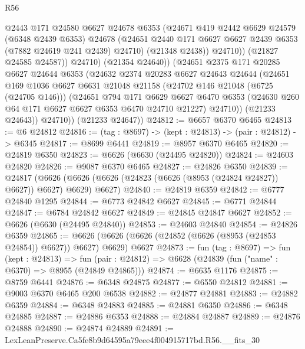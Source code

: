 \begin{lexlean}{R56}
\begin{coremodule}
                  @2443
                  @171
                  @24580
                  @6627
                  @24678
                  @6353
                  (@24671
                    @419
                    @2442
                    @6629
                    @24579
                    (@6348 @2439 @6353)
                    @24678
                    (@24651 @2440 @171 @6627 @6627 @2439 @6353 (@7882 @24619 @241 @2439) @24710)
                    (@21348 @2438))
                  @24710))
              (@21827 @24585 @24587))
            @24710)
          (@21354 @24640))
        (@24651
          @2375
          @171
          @20285
          @6627
          @24644
          @6353
          (@24632
            @2374
            @20283
            @6627
            @24643
            @24644
            (@24651
              @169
              @1036
              @6627
              @6631
              @21048
              @21158
              (@24702 @146 @21048 (@6725 (@24705 @146)))
              (@24651
                @794
                @171
                @6629
                @6627
                @6470
                @6353
                (@24630 @260 @64 @171 @6627 @6627 @6353 @6470 @24710 @21227)
                @24710))
            (@21233 @24643))
          @24710))
      (@21233 @24647))
@24812 := @6657 @6370 @6465
@24813 := @6 @24812
@24816 := (tag : @8697) -> (kept : @24813) -> (pair : @24812) -> @6345
@24817 := @8699 @6441
@24819 := @8957 @6370 @6465
@24820 := @24819 @6350
@24823 := @6626 (@6630 (@24495 @24820))
@24824 := @24603 @24820
@24826 := @9087 @6370 @6465
@24827 := @24826 @6350
@24839 := @24817
    (@6626 (@6626 (@6626 (@24823 (@6626 (@8953 (@24824 @24827)) @6627)) @6627) @6629) @6627)
@24840 := @24819 @6359
@24842 := @6777 @24840 @1295
@24844 := @6773 @24842 @6627
@24845 := @6771 @24844
@24847 := @6784 @24842 @6627
@24849 := @24845 @24847 @6627
@24852 := @6626 (@6630 (@24495 @24840))
@24853 := @24603 @24840
@24854 := @24826 @6359
@24865 := @6626 (@6626 (@6626 (@24852 (@6626 (@8953 (@24853 @24854)) @6627)) @6627) @6629) @6627
@24873 := fun (tag : @8697) =>
  fun (kept : @24813) =>
  fun (pair : @24812) => @6628 (@24839 (fun ("name" : @6370) => @8955 (@24849 @24865)))
@24874 := @6635 @1176
@24875 := @8759 @6441
@24876 := @6348 @24875
@24877 := @6550 @24812
@24881 := @9003 @6370 @6465 @200 @6538
@24882 := @24877 @24881
@24883 := @24882 @6359
@24884 := @6348 @24883
@24885 := @24881 @6350
@24886 := @6348 @24885
@24887 := @24886 @6353
@24888 := @24884 @24887
@24889 := @24876 @24888
@24890 := @24874 @24889
@24891 := LexLeanPreserve.Ca5fe8b9d64595a79eee4f004915717bd.R56.__fits_30

\end{coremodule}
\end{lexlean}
